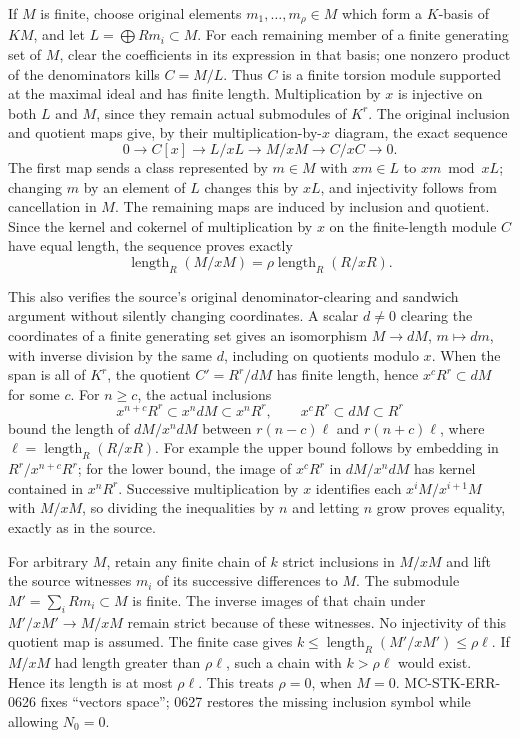 If \(M\) is finite, choose original elements \(m_1,\ldots,m_\rho\in M\) which form a \(K\)-basis of \(KM\), and let \(L=\bigoplus Rm_i\subset M\). For each remaining member of a finite generating set of \(M\), clear the coefficients in its expression in that basis; one nonzero product of the denominators kills \(C=M/L\). Thus \(C\) is a finite torsion module supported at the maximal ideal and has finite length. Multiplication by \(x\) is injective on both \(L\) and \(M\), since they remain actual submodules of \(K^r\). The original inclusion and quotient maps give, by their multiplication-by-\(x\) diagram, the exact sequence \[
 0\to C[x]\to L/xL\to M/xM\to C/xC\to0.
\] The first map sends a class represented by \(m\in M\) with \(xm\in L\) to \(xm\bmod xL\); changing \(m\) by an element of \(L\) changes this by \(xL\), and injectivity follows from cancellation in \(M\). The remaining maps are induced by inclusion and quotient. Since the kernel and cokernel of multiplication by \(x\) on the finite-length module \(C\) have equal length, the sequence proves exactly \[
 \operatorname{length}_R(M/xM)=\rho\operatorname{length}_R(R/xR).
\]

This also verifies the source's original denominator-clearing and sandwich argument without silently changing coordinates. A scalar \(d\ne0\) clearing the coordinates of a finite generating set gives an isomorphism \(M\to dM\), \(m\mapsto dm\), with inverse division by the same \(d\), including on quotients modulo \(x\). When the span is all of \(K^r\), the quotient \(C'=R^r/dM\) has finite length, hence \(x^cR^r\subset dM\) for some \(c\). For \(n\ge c\), the actual inclusions \[
 x^{n+c}R^r\subset x^n dM\subset x^nR^r,\qquad
 x^cR^r\subset dM\subset R^r
\] bound the length of \(dM/x^ndM\) between \(r(n-c)\ell\) and \(r(n+c)\ell\), where \(\ell=\operatorname{length}_R(R/xR)\). For example the upper bound follows by embedding in \(R^r/x^{n+c}R^r\); for the lower bound, the image of \(x^cR^r\) in \(dM/x^ndM\) has kernel contained in \(x^nR^r\). Successive multiplication by \(x\) identifies each \(x^iM/x^{i+1}M\) with \(M/xM\), so dividing the inequalities by \(n\) and letting \(n\) grow proves equality, exactly as in the source.

For arbitrary \(M\), retain any finite chain of \(k\) strict inclusions in \(M/xM\) and lift the source witnesses \(m_i\) of its successive differences to \(M\). The submodule \(M'=\sum_iRm_i\subset M\) is finite. The inverse images of that chain under \(M'/xM'\to M/xM\) remain strict because of these witnesses. No injectivity of this quotient map is assumed. The finite case gives \(k\le\operatorname{length}_R(M'/xM')\le\rho\ell\). If \(M/xM\) had length greater than \(\rho\ell\), such a chain with \(k>\rho\ell\) would exist. Hence its length is at most \(\rho\ell\). This treats \(\rho=0\), when \(M=0\). MC-STK-ERR-0626 fixes ``vectors space''; 0627 restores the missing inclusion symbol while allowing \(N_0=0\).

